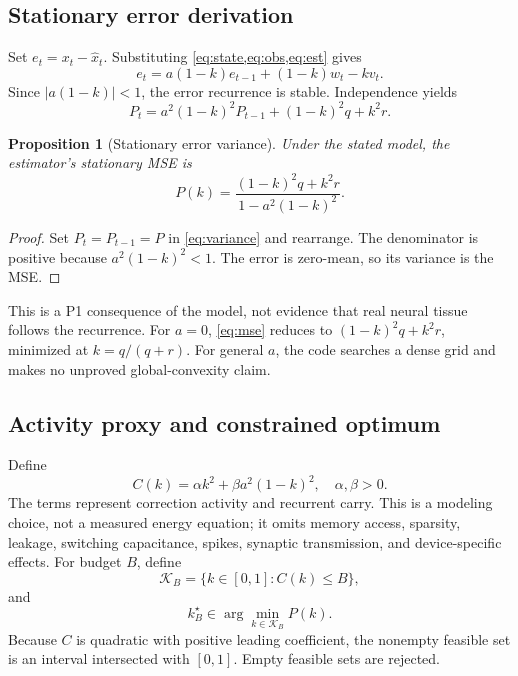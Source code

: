 \documentclass[10pt,a4paper]{article}
\newtheorem{proposition}{Proposition}
\begin{document}
\subsection{Stationary error derivation}
Set $e_t=x_t-\widehat{x}_t$. Substituting \cref{eq:state,eq:obs,eq:est} gives
\begin{equation}
e_t=a(1-k)e_{t-1}+(1-k)w_t-kv_t.
\label{eq:error}
\end{equation}
Since $|a(1-k)|<1$, the error recurrence is stable. Independence yields
\begin{equation}
P_t=a^2(1-k)^2P_{t-1}+(1-k)^2q+k^2r.
\label{eq:variance}
\end{equation}
\begin{proposition}[Stationary error variance]
Under the stated model, the estimator's stationary MSE is
\begin{equation}
P(k)=\frac{(1-k)^2q+k^2r}{1-a^2(1-k)^2}.
\label{eq:mse}
\end{equation}
\end{proposition}
\begin{proof}
Set $P_t=P_{t-1}=P$ in \cref{eq:variance} and rearrange. The denominator is positive because $a^2(1-k)^2<1$. The error is zero-mean, so its variance is the MSE.
\end{proof}
This is a P1 consequence of the model, not evidence that real neural tissue follows the recurrence. For $a=0$, \cref{eq:mse} reduces to $(1-k)^2q+k^2r$, minimized at $k=q/(q+r)$. For general $a$, the code searches a dense grid and makes no unproved global-convexity claim.

\subsection{Activity proxy and constrained optimum}
Define
\begin{equation}
C(k)=\alpha k^2+\beta a^2(1-k)^2,\quad \alpha,\beta>0.
\label{eq:cost}
\end{equation}
The terms represent correction activity and recurrent carry. This is a modeling choice, not a measured energy equation; it omits memory access, sparsity, leakage, switching capacitance, spikes, synaptic transmission, and device-specific effects. For budget $B$, define
\begin{equation}
\mathcal{K}_B=\{k\in[0,1]:C(k)\leq B\},
\label{eq:feasible}
\end{equation}
and
\begin{equation}
k_B^\star\in\arg\min_{k\in\mathcal{K}_B}P(k).
\label{eq:opt}
\end{equation}
Because $C$ is quadratic with positive leading coefficient, the nonempty feasible set is an interval intersected with $[0,1]$. Empty feasible sets are rejected.
\end{document}
